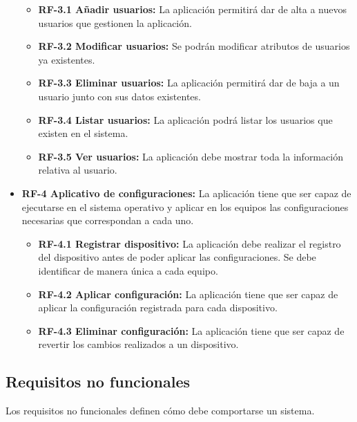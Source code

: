\begin{itemize}
	\begin{itemize}
		\tightlist
		\item \textbf{RF-3.1 Añadir usuarios:} La aplicación permitirá dar de alta a nuevos usuarios que gestionen la aplicación.
		\item \textbf{RF-3.2 Modificar usuarios:} Se podrán modificar atributos de usuarios ya existentes.
		\item \textbf{RF-3.3 Eliminar usuarios:} La aplicación permitirá dar de baja a un usuario junto con sus datos existentes.
		\item \textbf{RF-3.4 Listar usuarios:} La aplicación podrá listar los usuarios que existen en el sistema.
		\item \textbf{RF-3.5 Ver usuarios:} La aplicación debe mostrar toda la información relativa al usuario.
	\end{itemize}
	\item \textbf{RF-4 Aplicativo de configuraciones:} La aplicación tiene que ser capaz de ejecutarse en el sistema operativo y aplicar en los equipos las configuraciones necesarias que correspondan a cada uno.
	\begin{itemize}
		\tightlist
		\item \textbf{RF-4.1 Registrar dispositivo:} La aplicación debe realizar el registro del dispositivo antes de poder aplicar las configuraciones.
		Se debe identificar de manera única a cada equipo.
		\item \textbf{RF-4.2 Aplicar configuración:} La aplicación tiene que ser capaz de aplicar la configuración registrada para cada dispositivo.
		\item \textbf{RF-4.3 Eliminar configuración:} La aplicación tiene que ser capaz de revertir los cambios realizados a un dispositivo.
	\end{itemize}
\end{itemize}


\subsection{Requisitos no funcionales}\label{subsec:requisitos-no-funcionales}

Los requisitos no funcionales definen cómo debe comportarse un sistema.

